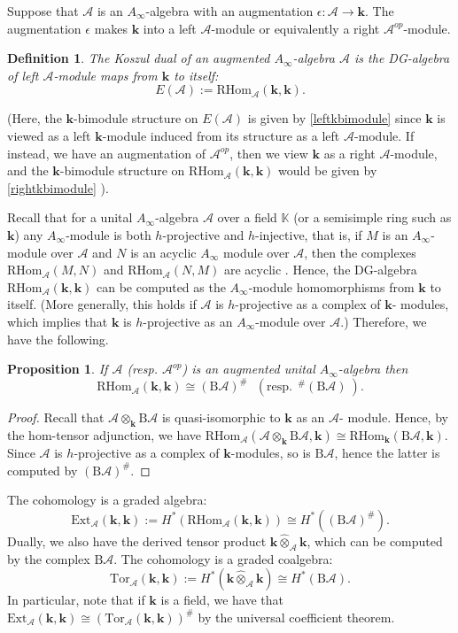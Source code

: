 \documentclass{gtpart}
\newtheorem{prop}[thm]{Proposition}
\newtheorem{defi}[thm]{Definition}
\newcommand{\rhom}{\mathrm{RHom}}
\renewcommand{\k}{\mathbf{k}}
\newcommand{\A}{\mathscr{A}}
\renewcommand{\Bar}{\mathrm{B}}
\begin{document}
Suppose that $\A$ is an $A_\infty$-algebra with an augmentation
$\epsilon\colon \A\to \k$. The augmentation $\epsilon$ makes $\k$ into a left $\A$-module or          equivalently a
right $\A^{op}$-module. 

\begin{defi} The \emph{Koszul dual} of an augmented $A_\infty$-algebra $\A$ is the DG-algebra of left $\A$-module maps     from $\k$ to
    itself:
        \[ E(\A) := \rhom_{\A} (\k,\k). \]
    \end{defi}
(Here, the $\k$-bimodule structure on $E(\A)$ is given by \eqref{leftkbimodule} since $\k$ is
viewed as a left $\k$-module induced from its structure as a left $\A$-module. If instead, we have
an augmentation of $\A^{op}$, then we view $\k$ as a right $\A$-module, and the
$\k$-bimodule structure on $\rhom_{\A}(\k,\k)$ would be given by \eqref{rightkbimodule} ). 

    Recall that for a unital $A_\infty$-algebra $\A$ over a field $\mathbb{K}$ (or a semisimple ring such
    as $\k$) any $A_\infty$-module is both $h$-projective and $h$-injective, that is, if $M$ is an
    $A_\infty$-module over $\A$ and $N$ is an acyclic $A_\infty$ module over $\A$, then the
    complexes $\rhom_{\A}(M,N)$ and $\rhom_{\A}(N,M)$ are acyclic \cite[Lemma 1.16]{seidelbook}. Hence, the DG-algebra
    $\rhom_{\A}(\k,\k)$ can be computed as the $A_\infty$-module homomorphisms from     $\k$ to
    itself. (More generally, this holds if $\A$ is $h$-projective as a complex of $\k$-
    modules, which implies that $\k$ is $h$-projective as an $A_\infty$-module over $\A$.) Therefore, we have the following.

\begin{prop} If $\A$ (resp. $\A^{op}$) is an augmented unital $A_\infty$-algebra then
    \[ \rhom_{\A}(\k,\k) \cong
    (\Bar\A)^\# \ \ \ (\text{resp.} \ \  \!^\#(\Bar \A) \  ). \]    
\end{prop}
\begin{proof} Recall that $\A \otimes_\k \Bar\A$ is quasi-isomorphic to $\k$ as an $\A$-  module. Hence,
        by the hom-tensor adjunction, we have $\rhom_{\A} (\A \otimes_\k \Bar\A , \k) \cong
        \rhom_{\k} (\Bar\A,
            \k )$. Since $\A$ is $h$-projective as a complex of $\k$-modules, so is $\Bar\A$, hence
            the latter
                is computed by $(\Bar\A)^\#$.
            \end{proof}
The cohomology is a graded algebra:     \[ \mathrm{Ext}_{\A}(\k,\k) := H^*          (\rhom_{\A}(\k,\k)) \cong
H^*((\Bar\A)^\#). \]
Dually, we also have the derived tensor product $\k \widehat{\otimes}_\A \k$, which can be computed
by the complex $\Bar\A$. The cohomology is a graded coalgebra:
\[ \mathrm{Tor}_{\A}(\k,\k) := H^*(\k \widehat{\otimes}_\A \k) \cong H^*(\Bar\A). \]
In particular, note that if $\k$ is a field, we have that $\mathrm{Ext}_{\A}(\k,\k) \cong
(\mathrm{Tor}_{\A}(\k,\k))^\#$ by the universal coefficient theorem.
\end{document}
